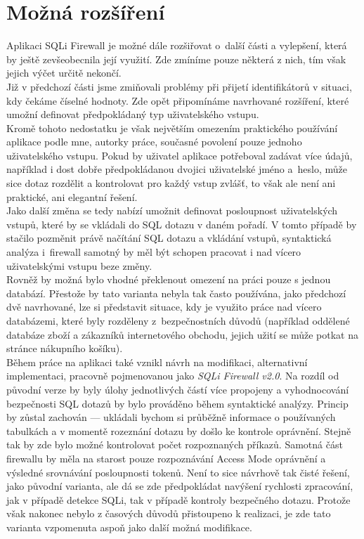 \section{Možná rozšíření} \label{sec:7:rozsireni}
Aplikaci SQLi Firewall je možné dále rozšiřovat o~další části a vylepšení, která by ještě zevšeobecnila její využití. Zde zmíníme pouze
některá z nich, tím však jejich výčet určitě nekončí. \\

Již v předchozí části jsme zmiňovali problémy při přijetí identifikátorů v situaci, kdy čekáme číselné hodnoty. Zde opět připomínáme 
navrhované rozšíření, které umožní definovat předpokládaný typ uživatelského vstupu. \\

Kromě tohoto nedostatku je však největším omezením praktického používání aplikace podle mne, autorky práce, současné povolení pouze 
jednoho uživatelského vstupu. Pokud by uživatel aplikace potřeboval zadávat více údajů, například i dost dobře předpokládanou dvojici 
uživatelské jméno a~heslo, může sice dotaz rozdělit a kontrolovat pro každý vstup zvlášť, to však ale není ani praktické, ani elegantní 
řešení. \\

Jako další změna se tedy nabízí umožnit definovat posloupnost uživatelských vstupů, které by se vkládali do SQL dotazu v daném pořadí. 
V tomto případě by stačilo pozměnit právě načítání SQL dotazu a vkládání vstupů, syntaktická analýza i~firewall samotný by měl být schopen
pracovat i nad vícero uživatelskými vstupu beze změny. \\

Rovněž by možná bylo vhodné překlenout omezení na práci pouze s jednou databází. Přestože by tato varianta nebyla tak často používána, 
jako předchozí dvě navrhované, lze si představit situace, kdy je využito práce nad vícero databázemi, které byly rozděleny z~bezpečnostních důvodů
(například oddělené databáze zboží a zákazníků internetového obchodu, jejich užití se může potkat na stránce nákupního košíku). \\

Během práce na aplikaci také vznikl návrh na modifikaci, alternativní implementaci, pracovně pojmenovanou jako \textit{SQLi Firewall v2.0}. 
Na rozdíl od původní verze by byly úlohy jednotlivých částí více propojeny a vyhodnocování bezpečnosti SQL dotazů by bylo prováděno během 
syntaktické analýzy. Princip by zůstal zachován --- ukládali bychom si průběžně informace o používaných tabulkách a v momentě rozeznání dotazu 
by došlo ke kontrole oprávnění. Stejně tak by zde bylo možné kontrolovat počet rozpoznaných příkazů. Samotná část firewallu by měla na starost 
pouze rozpoznávání Access Mode oprávnění a výsledné srovnávání posloupnosti tokenů. Není to sice návrhově tak čisté řešení, jako původní varianta, 
ale dá se zde předpokládat navýšení rychlosti zpracování, jak v případě detekce SQLi, tak v případě kontroly bezpečného dotazu. Protože však nakonec
nebylo z časových důvodů přistoupeno k realizaci, je zde tato varianta vzpomenuta aspoň jako další možná modifikace.

